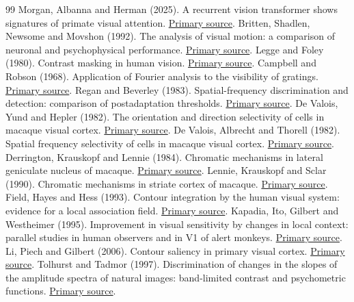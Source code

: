 \begin{thebibliography}{99}
\small\setlength{\itemsep}{4pt}
 Morgan, Albanna and Herman (2025). A recurrent vision transformer shows signatures of primate visual attention. \href{https://arxiv.org/abs/2502.10955}{Primary source}.
 Britten, Shadlen, Newsome and Movshon (1992). The analysis of visual motion: a comparison of neuronal and psychophysical performance. \href{https://pubmed.ncbi.nlm.nih.gov/1464765/}{Primary source}.
 Legge and Foley (1980). Contrast masking in human vision. \href{https://pubmed.ncbi.nlm.nih.gov/7463185/}{Primary source}.
 Campbell and Robson (1968). Application of Fourier analysis to the visibility of gratings. \href{https://doi.org/10.1113/jphysiol.1968.sp008574}{Primary source}.
 Regan and Beverley (1983). Spatial-frequency discrimination and detection: comparison of postadaptation thresholds. \href{https://pubmed.ncbi.nlm.nih.gov/6663371/}{Primary source}.
 De Valois, Yund and Hepler (1982). The orientation and direction selectivity of cells in macaque visual cortex. \href{https://pubmed.ncbi.nlm.nih.gov/7112953/}{Primary source}.
 De Valois, Albrecht and Thorell (1982). Spatial frequency selectivity of cells in macaque visual cortex. \href{https://pubmed.ncbi.nlm.nih.gov/7112954/}{Primary source}.
 Derrington, Krauskopf and Lennie (1984). Chromatic mechanisms in lateral geniculate nucleus of macaque. \href{https://pubmed.ncbi.nlm.nih.gov/6512691/}{Primary source}.
 Lennie, Krauskopf and Sclar (1990). Chromatic mechanisms in striate cortex of macaque. \href{https://pubmed.ncbi.nlm.nih.gov/2303866/}{Primary source}.
 Field, Hayes and Hess (1993). Contour integration by the human visual system: evidence for a local association field. \href{https://pubmed.ncbi.nlm.nih.gov/8447091/}{Primary source}.
 Kapadia, Ito, Gilbert and Westheimer (1995). Improvement in visual sensitivity by changes in local context: parallel studies in human observers and in V1 of alert monkeys. \href{https://pubmed.ncbi.nlm.nih.gov/7576633/}{Primary source}.
 Li, Piech and Gilbert (2006). Contour saliency in primary visual cortex. \href{https://pubmed.ncbi.nlm.nih.gov/16772175/}{Primary source}.
 Tolhurst and Tadmor (1997). Discrimination of changes in the slopes of the amplitude spectra of natural images: band-limited contrast and psychometric functions. \href{https://pubmed.ncbi.nlm.nih.gov/9509160/}{Primary source}.

\end{thebibliography}
